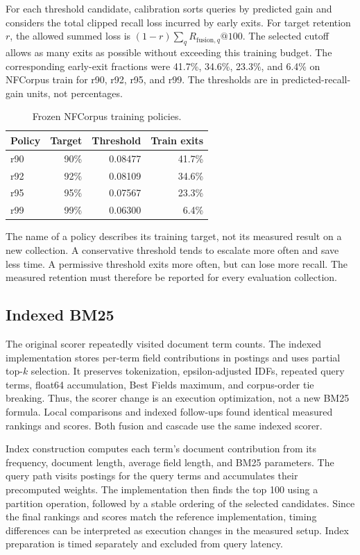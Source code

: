 \documentclass[conference]{IEEEtran}
\begin{document}
For each threshold candidate, calibration sorts queries by predicted gain and considers the total clipped recall loss incurred by early exits. For target retention $r$, the allowed summed loss is $(1-r)\sum_q R_{\mathrm{fusion},q}@100$. The selected cutoff allows as many exits as possible without exceeding this training budget. The corresponding early-exit fractions were 41.7\%, 34.6\%, 23.3\%, and 6.4\% on NFCorpus train for r90, r92, r95, and r99. The thresholds are in predicted-recall-gain units, not percentages.

\begin{table}[t]
\centering
\caption{Frozen NFCorpus training policies.}
\label{tab:policies}
\small
\begin{tabular}{lrrr}
\toprule
Policy & Target & Threshold & Train exits\\
\midrule
r90 & 90\% & 0.08477 & 41.7\%\\
r92 & 92\% & 0.08109 & 34.6\%\\
r95 & 95\% & 0.07567 & 23.3\%\\
r99 & 99\% & 0.06300 & 6.4\%\\
\bottomrule
\end{tabular}
\end{table}

The name of a policy describes its training target, not its measured result on a new collection. A conservative threshold tends to escalate more often and save less time. A permissive threshold exits more often, but can lose more recall. The measured retention must therefore be reported for every evaluation collection.

\subsection{Indexed BM25}
The original scorer repeatedly visited document term counts. The indexed implementation stores per-term field contributions in postings and uses partial top-$k$ selection. It preserves tokenization, epsilon-adjusted IDFs, repeated query terms, float64 accumulation, Best Fields maximum, and corpus-order tie breaking. Thus, the scorer change is an execution optimization, not a new BM25 formula. Local comparisons and indexed follow-ups found identical measured rankings and scores. Both fusion and cascade use the same indexed scorer.

Index construction computes each term's document contribution from its frequency, document length, average field length, and BM25 parameters. The query path visits postings for the query terms and accumulates their precomputed weights. The implementation then finds the top 100 using a partition operation, followed by a stable ordering of the selected candidates. Since the final rankings and scores match the reference implementation, timing differences can be interpreted as execution changes in the measured setup. Index preparation is timed separately and excluded from query latency.
\end{document}
